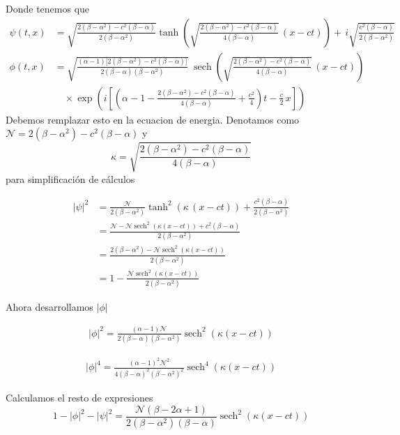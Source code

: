 \documentclass[letterpaper,11pt]{exam}
\newcommand{\sech}{\operatorname{sech}}
\theoremstyle{plain}
\begin{document}
Donde tenemos que  
\begin{align*}
\psi(t,x) &=
\sqrt{\frac{2(\beta-\alpha^2)-c^2(\beta-\alpha)}{2(\beta-\alpha^2)}}
\tanh\!\left(\sqrt{\frac{2(\beta-\alpha^2)-c^2(\beta-\alpha)}{4(\beta-\alpha)}}\,(x-ct)\right)
+\,i\sqrt{\frac{c^2(\beta-\alpha)}{2(\beta-\alpha^2)}}
\\[12pt]
\phi(t,x) &=
\sqrt{\frac{(\alpha-1)\bigl[2(\beta-\alpha^2)-c^2(\beta-\alpha)\bigr]}{2(\beta-\alpha)(\beta-\alpha^2)}}
\;\operatorname{sech}\!\left(\sqrt{\frac{2(\beta-\alpha^2)-c^2(\beta-\alpha)}{4(\beta-\alpha)}}\,(x-ct)\right)
\\[6pt]
&\quad\times
\exp\!\left(i\left[\left(\alpha-1-\frac{2(\beta-\alpha^2)-c^2(\beta-\alpha)}{4(\beta-\alpha)}+\frac{c^2}{4}\right)t
-\frac{c}{2}\,x\right]\right)
\end{align*}
Debemos remplazar esto en la ecuacion de energia. Denotamos como $\mathcal{N}=2(\beta-\alpha^2)-c^2(\beta-\alpha)$ y $$ \kappa= \sqrt{\frac{2(\beta-\alpha^2)-c^2(\beta-\alpha)}{4(\beta-\alpha)}}$$ para simplificación de cálculos

\begin{align*}
    |\psi|^2&=\frac{\mathcal{N}}{2(\beta-\alpha^2)}
\tanh^2\!\left(\kappa\,(x-ct)\right)+\frac{c^2(\beta-\alpha)}{2(\beta-\alpha^2)} \\
            &=\frac{\mathcal{N}-\mathcal{N}\sech^2(\kappa(x-ct))+c^2(\beta-\alpha)}{2(\beta-\alpha^2)}\\
            &=\frac{2(\beta-\alpha^2)-\mathcal{N}\sech^2(\kappa(x-ct))}{2(\beta-\alpha^2)} \\
            &=1-\frac{\mathcal{N}\sech^2(\kappa(x-ct))}{2(\beta-\alpha^2)}
\end{align*}

Ahora desarrollamos $|\phi|$

\begin{align*}
    |\phi|^2=\frac{(\alpha-1)\mathcal{N}}{2(\beta-\alpha)(\beta-\alpha^2)}\sech^2(\kappa(x-ct))
\end{align*}

\begin{align*}
    |\phi|^4=\frac{(\alpha-1)^2\mathcal{N}^2}{4(\beta-\alpha)^2(\beta-\alpha^2)^2}\sech^4(\kappa(x-ct))
\end{align*}

Calculamos el resto de expresiones
\begin{equation*}
    1-|\phi|^2-|\psi|^2=\frac{\mathcal{N}(\beta-2\alpha+1)}{2(\beta-\alpha^2)(\beta-\alpha)}\sech^2(\kappa(x-ct))
\end{equation*}
\end{document}
